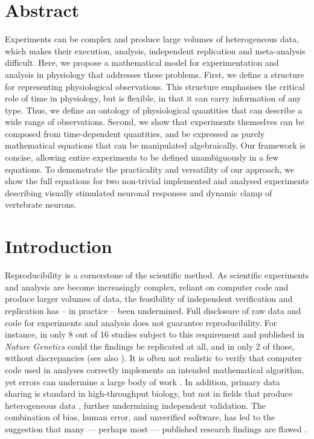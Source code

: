 
\section*{Abstract}

Experiments can be complex and produce large volumes of heterogeneous
data, which makes their execution, analysis, independent replication
and meta-analysis difficult. Here, we propose a mathematical model for
experimentation and analysis in physiology that addresses these
problems. First, we define a structure for representing physiological
observations. This structure emphasises the critical role of time in
physiology, but is flexible, in that it can carry information of any
type. Thus, we define an ontology of physiological quantities that can
describe a wide range of observations. Second, we show that
experiments themselves can be composed from time-dependent quantities,
and be expressed as purely mathematical equations that can be
manipulated algebraically. Our framework is concise, allowing entire
experiments to be defined unambiguously in a few equations. To
demonstrate the practicality and versatility of our approach, we show
the full equations for two non-trivial implemented and analysed
experiments describing visually stimulated neuronal responses and
dynamic clamp of vertebrate neurons. 

\pagebreak

\section*{Introduction}

Reproducibility is a cornerstone of the scientific method. As
scientific experiments and analysis are become increasingly complex,
reliant on computer code and produce larger volumes of data, the
feasibility of independent verification and replication has -- in
practice -- been undermined. Full disclosure of raw data and code for
experiments and analysis does not guarantee reproducibility.  For
instance, in only 8 out of 16 studies subject to this requirement and
published in \emph{Nature Genetics} could the findings be replicated
at all, and in only 2 of those, without discrepancies
\cite{Ioannidis2008} (see also \cite{Baggerly2009,
  McCullough2007}). It is often not realistic to verify that computer
code used in analyses correctly implements an intended mathematical
algorithm, yet errors can undermine a large body of work
\cite{Chang2006}.  In addition, primary data sharing is standard in
high-throughput biology, but not in fields that produce heterogeneous
data \cite{Gardner2005}, further undermining independent validation.
The combination of bias, human error, and unverified software, has led
to the suggestion that many --- perhaps most --- published research
findings are flawed \cite{Ioannidis2005, Merali2010}.

